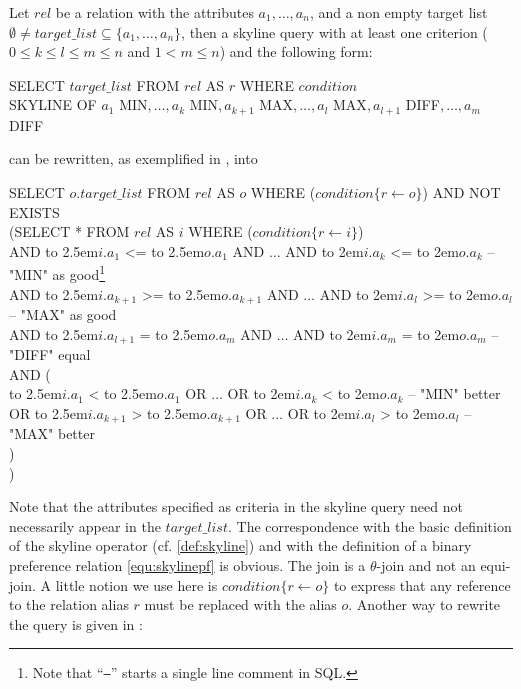 Let $rel$ be a relation with the attributes $a_1, \ldots, a_n$, and a non
empty target list $\emptyset \not= target\_list \subseteq \{a_1,
\ldots, a_n\}$, then a skyline query with at least one criterion ($0
\le k \le l \le m \le n$ and $1 < m \le n$) and the following form:
%
\begin{sql}
SELECT $target\_list$ FROM $rel$ AS $r$ WHERE $condition$ \\
SKYLINE OF $a_1$ MIN$, \ldots, a_k$ MIN$, a_{k+1}$ MAX$, \ldots, a_l$ MAX$, a_{l+1}$ DIFF$, \ldots, a_m$ DIFF
\end{sql}
%
can be rewritten, as exemplified in \citep{Borzsonyi2001}, into
%
\begin{sql}\label{sql:rewritten-non-distinct}
\newcommand\abox[1]{\hbox to 2.5em{#1\hfil}}%
\newcommand\bbox[1]{\hbox to 2em{#1\hfil}}%
SELECT $o.target\_list$ FROM $rel$ AS $o$ WHERE ($condition\{r \gets o\}$) AND NOT EXISTS \\
(SELECT * FROM $rel$ AS $i$ WHERE ($condition\{r \gets i\}$) \\
AND \abox{$i.a_1$} <= \abox{$o.a_1$} AND $\ldots$ AND \bbox{$i.a_k$} <= \bbox{$o.a_k$} -- "MIN" as good\footnote{Note that ``\texttt{--}'' starts a single line comment in SQL.}\\
AND \abox{$i.a_{k+1}$} >= \abox{$o.a_{k+1}$} AND $\ldots$ AND \bbox{$i.a_l$} >= \bbox{$o.a_l$} -- "MAX" as good\\
AND \abox{$i.a_{l+1}$} { }= \abox{$o.a_m$} AND $\ldots$ AND \bbox{$i.a_m$} { }= \bbox{$o.a_m$} -- "DIFF" equal \\
AND (\\
\phantom{{ }{ }{ }}\abox{$i.a_1$} < \abox{$o.a_1$} OR $\ldots$ OR \bbox{$i.a_k$} < \bbox{$o.a_k$} -- "MIN" better \\
OR \abox{$i.a_{k+1}$} > \abox{$o.a_{k+1}$} OR $\ldots$ OR \bbox{$i.a_l$} > \bbox{$o.a_l$} -- "MAX" better \\
)\\
)
\end{sql}

Note that the attributes specified as criteria in the skyline query
need not necessarily appear in the $target\_list$.
%
The correspondence with the basic definition of the skyline operator
(cf. \autoref{def:skyline}) and with the definition of a binary
preference relation \eqref{equ:skylinepf} is obvious.
%
The join is a $\theta$-join and not an equi-join.
%
A little notion we use here is $condition\{r \gets o\}$ to express
that any reference to the relation alias $r$ must be replaced with
the alias $o$.
%
Another way to rewrite the query is given in
\citep[Page~3]{Godfrey2004}:

